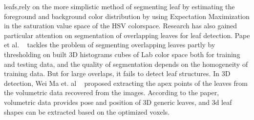 leafs,rely on the more simplistic method of segmenting leaf by estimating the foreground and background color distribution by using Expectation Maximization in the saturation value space of the HSV colorspace. Research has also gained particular attention on segmentation of overlapping leaves for leaf detection. Pape et al. ~\cite{Pape2015} tackles the problem of segmenting overlapping leaves partly by thresholding on built 3D histograms cubes of Lab color space both for training and testing data, and the quality of segmentation depends on the homogeneity of training data. But for large overlaps, it fails to detect leaf structures.  In 3D detection, Wei Ma et. al ~\cite{ma2008image} proposed extracting the apex points of the leaves from the volumetric data recovered from the images. According to the paper, volumetric data provides pose and position of 3D generic leaves, and 3d leaf shapes can be extracted based on the optimized voxels.


